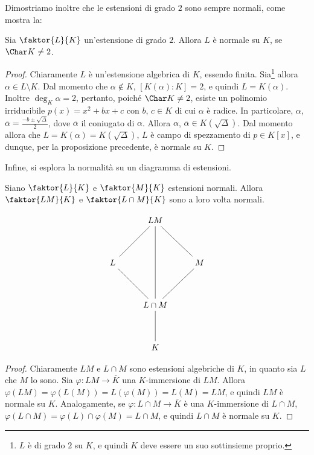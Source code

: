 \documentclass[12pt]{scrartcl}
\begin{document}
	Dimostriamo inoltre che le estensioni di grado $2$
	sono sempre normali, come mostra la:
	
	\begin{proposition}
		Sia $\faktor{L}{K}$ un'estensione di grado $2$.
		Allora $L$ è normale su $K$, se $\Char K \neq 2$.
	\end{proposition}

	\begin{proof}
		Chiaramente $L$ è un'estensione algebrica di $K$,
		essendo finita. Sia\footnote{
			$L$ è di grado $2$ su $K$, e quindi $K$ deve
			essere un suo sottinsieme proprio.
		} allora $\alpha \in L \setminus K$. Dal momento che
		$\alpha \notin K$, $[K(\alpha) : K] = 2$, e quindi
		$L = K(\alpha)$. Inoltre $\deg_K \alpha = 2$, pertanto,
		poiché $\Char K \neq 2$,
		esiste un polinomio irriducibile
		$p(x) = x^2 + bx + c$ con $b$, $c \in K$
		di cui $\alpha$ è radice. In particolare,
		$\alpha$, $\overline{\alpha} = \frac{-b \pm \sqrt{\Delta}}{2}$, dove
		$\overline{\alpha}$ il coniugato di $\alpha$.
		Allora $\alpha$, $\overline{\alpha} \in K(\sqrt{\Delta})$. Dal momento allora che
		$L = K(\alpha) = K(\sqrt{\Delta})$, $L$ è
		campo di spezzamento di $p \in K[x]$, e dunque,
		per la proposizione precedente, è normale su $K$.
	\end{proof}

	Infine, si esplora la normalità su un diagramma di
	estensioni.
	
	\begin{proposition}
		Siano $\faktor{L}{K}$ e $\faktor{M}{K}$ estensioni
		normali. Allora $\faktor{LM}{K}$ e
		$\faktor{L \cap M}{K}$ sono a loro volta normali.
		
		\[\begin{tikzcd}[column sep=small]
			&& LM \\
			\\
			L &&&& M \\
			\\
			&& {L \cap M} \\
			\\
			&& K
			\arrow[no head, from=5-3, to=7-3]
			\arrow[no head, from=1-3, to=3-5]
			\arrow[no head, from=1-3, to=3-1]
			\arrow[no head, from=3-1, to=5-3]
			\arrow[no head, from=5-3, to=3-5]
			\arrow[no head, from=1-3, to=5-3]
		\end{tikzcd}\]
	\end{proposition}

	\begin{proof}
		Chiaramente $LM$ e $L \cap M$ sono estensioni
		algebriche di $K$, in quanto sia $L$ che $M$ lo sono.
		Sia $\varphi : LM \to \overline{K}$ una $K$-immersione
		di $LM$. Allora $\varphi(LM) = \varphi(L(M)) =
		L(\varphi(M)) = L(M) = LM$, e quindi $LM$ è normale
		su $K$. Analogamente, se $\varphi : L \cap M \to \overline{K}$ è una $K$-immersione di $L \cap M$,
		$\varphi(L \cap M) = \varphi(L) \cap \varphi(M) = L \cap M$, e quindi $L \cap M$ è normale su $K$.
	\end{proof}
\end{document}
